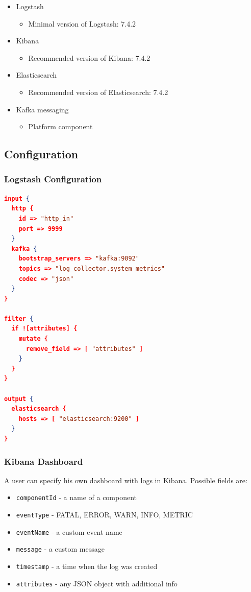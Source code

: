 \begin{itemize}
    \item Logstash
        \begin{itemize}
            \item Minimal version of Logstash: 7.4.2
        \end{itemize}
    \item Kibana
        \begin{itemize}
            \item Recommended version of Kibana: 7.4.2
        \end{itemize}
    \item Elasticsearch
        \begin{itemize}
            \item Recommended version of Elasticsearch: 7.4.2
        \end{itemize}
    \item Kafka messaging
        \begin{itemize}
            \item Platform component
        \end{itemize}
\end{itemize}

\subsection{Configuration}

\subsubsection{Logstash Configuration}

\begin{lstlisting}[language=json,firstnumber=1]
input {
  http {
    id => "http_in"
    port => 9999
  }
  kafka {
    bootstrap_servers => "kafka:9092"
    topics => "log_collector.system_metrics"
    codec => "json"
  }
}

filter {
  if ![attributes] {
    mutate {
      remove_field => [ "attributes" ]
    }
  }
}

output {
  elasticsearch {
    hosts => [ "elasticsearch:9200" ]
  }
}
\end{lstlisting}

\subsubsection{Kibana Dashboard}

A user can specify his own dashboard with logs in Kibana. Possible fields are:
\begin{itemize}
    \item \texttt{componentId} - a name of a component
    \item \texttt{eventType} - FATAL, ERROR, WARN, INFO, METRIC
    \item \texttt{eventName} - a custom event name
    \item \texttt{message} - a custom message
    \item \texttt{timestamp} - a time when the log was created
    \item \texttt{attributes} - any JSON object with additional info
\end{itemize}
